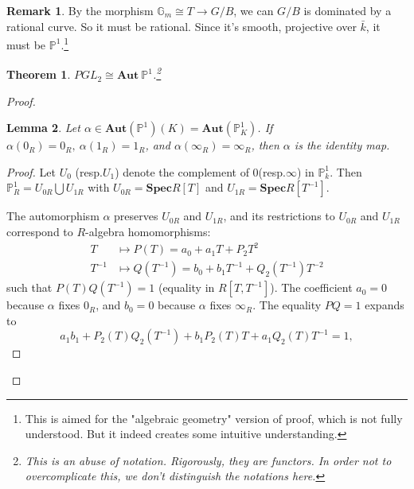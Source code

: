 \documentclass[12pt,a4paper,english]{article}
\theoremstyle{plain}
\newtheorem{thm}{Theorem}[section]
\newtheorem{lem}[thm]{Lemma}
\theoremstyle{definition}
\newtheorem*{rem}{Remark}
\begin{document}
\begin{rem}
By the morphism $\mathbb{G}_{m}\cong T\rightarrow G/B$, we can $G/B$ is dominated by a rational curve. So it must be rational. Since it's smooth, projective over $\bar{k}$, it must be $\mathbb{P}^{1}$.\footnote{This is aimed for the "algebraic geometry" version of proof, which is not fully understood. But it indeed creates some intuitive understanding.}
\end{rem}
\begin{thm}
$PGL_{2}\cong\textbf{Aut}\ \mathbb{P}^{1}$.\footnote{This is an abuse of notation. Rigorously, they are functors. In order not to overcomplicate this, we don't distinguish the notations here. }
\end{thm}
\begin{proof}
\begin{lem}\label{lem20.8}
Let $\alpha\in\textbf{Aut}(\mathbb{P}^{1})(K)=\textbf{Aut}(\mathbb{P}^{1}_{K})$. If $\alpha(0_{R})=0_{R},\ \alpha(1_{R})=1_{R}$, and $\alpha(\infty_{R})=\infty_{R}$, then $\alpha$ is the identity map.
\end{lem}
\begin{proof}
Let $U_{0}$ (resp.$U_{1}$) denote the complement of $0$(resp.$\infty$) in $\mathbb{P}_{k}^{1}$. Then $\mathbb{P}^{1}_{R}=U_{0R}\bigcup U_{1R}$ with $U_{0R}=\textbf{Spec} R[T]$ and $U_{1R}=\textbf{Spec} R[T^{-1}]$.
\begin{center}
\end{center}
The automorphism $\alpha$ preserves $U_{0R}$ and $U_{1R}$, and its restrictions to $U_{0R}$ and $U_{1R}$ correspond to $R$-algebra homomorphisms:
\begin{align*}
    T&\mapsto P(T)=a_{0}+a_{1}T+P_{2}T^{2}\\
    T^{-1}&\mapsto Q(T^{-1})=b_{0}+b_{1}T^{-1}+Q_{2}(T^{-1})T^{-2}
\end{align*}
such that $P(T)Q(T^{-1})=1$ (equality in $R[T,T^{-1}]$). The coefficient $a_{0}=0$ because $\alpha$ fixes $0_{R}$, and $b_{0}=0$ because $\alpha$ fixes $\infty_{R}$. The equality $PQ=1$ expands to 
\begin{equation*}
    a_{1}b_{1}+P_{2}(T)Q_{2}(T^{-1})+b_{1}P_{2}(T)T+a_{1}Q_{2}(T)T^{-1}=1,

\end{equation*}
\end{proof}
\end{proof}
\end{document}
